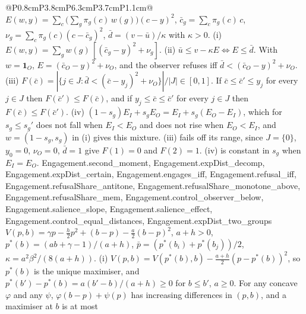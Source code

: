 \begin{longtable}{@{}P{0.8cm}P{3.8cm}P{6.3cm}P{3.7cm}P{1.1cm}@{}}
{  $E(w,y)=\sum_c\big(\sum_g\pi_g(c)\,w(g)\big)(c-y)^2$,
  $\bar c_g=\sum_c\pi_g(c)\,c$, $\nu_g=\sum_c\pi_g(c)(c-\bar c_g)^2$,
  $\bar d=(v-\bar u)/\kappa$ with $\kappa>0$.
  (i) $E(w,y)=\sum_g w(g)\,[(\bar c_g-y)^2+\nu_g]$.
  (ii) $\bar u\le v-\kappa E\iff E\le\bar d$. With $w=\mathbf 1_O$,
  $E=(\bar c_O-y)^2+\nu_O$, and the observer refuses iff
  $\bar d<(\bar c_O-y)^2+\nu_O$.
  (iii) $F(\bar c)=|\{j\in J:\bar d<(\bar c-y_j)^2+\nu_O\}|/|J|\in[0,1]$.
  If $\bar c\le\bar c'\le y_j$ for every $j\in J$ then $F(\bar c')\le F(\bar c)$,
  and if $y_j\le\bar c\le\bar c'$ for every $j\in J$ then $F(\bar c)\le F(\bar c')$.
  (iv) $(1-s_g)E_I+s_gE_O=E_I+s_g(E_O-E_I)$, which for $s_g\le s_g'$ does not
  fall when $E_I<E_O$ and does not rise when $E_O<E_I$, and $w=(1-s_g,s_g)$
  in (i) gives this mixture.
  (iii) fails off its range, since $J=\{0\}$, $y_0=0$, $\nu_O=0$, $\bar d=1$
  give $F(1)=0$ and $F(2)=1$. (iv) is constant in $s_g$ when $E_I=E_O$.}
  {Engagement.second_moment, Engagement.expDist_decomp, Engagement.expDist_certain, Engagement.engages_iff, Engagement.refusal_iff, Engagement.refusalShare_antitone, Engagement.refusalShare_monotone_above, Engagement.refusalShare_mem, Engagement.control_observer_below, Engagement.salience_slope, Engagement.salience_effect, Engagement.control_equal_distances, Engagement.expDist_two_groups}
  {$V(p,b)=\gamma p-\tfrac{h}{2}p^2+(b-p)-\tfrac{a}{2}(b-p)^2$, $a+h>0$,
  $p^*(b)=(ab+\gamma-1)/(a+h)$, $\bar p=(p^*(b_i)+p^*(b_j))/2$,
  $\kappa=a^2\beta^2/(8(a+h))$.
  (i) $V(p,b)=V(p^*(b),b)-\tfrac{a+h}{2}(p-p^*(b))^2$, so $p^*(b)$ is the
  unique maximiser, and $p^*(b')-p^*(b)=a(b'-b)/(a+h)\ge0$ for $b\le b'$,
  $a\ge0$. For any concave $\varphi$ and any $\psi$, $\varphi(b-p)+\psi(p)$
  has increasing differences in $(p,b)$, and a maximiser at $b$ is at most
}
\end{longtable}
